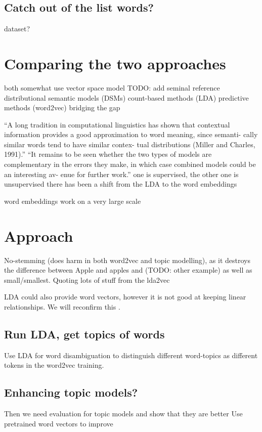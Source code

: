 \documentclass{sig-alternate-05-2015}
\begin{document}
\subsection{Catch out of the list words?}
dataset?
\section{Comparing the two approaches}
both somewhat use vector space model TODO: add seminal reference
distributional semantic models (DSMs)
count-based methods (LDA)
predictive methods (word2vec)
\cite{Baroni2014}
bridging the gap

``A long tradition in computational linguistics has shown that contextual information provides a good approximation to word meaning, since semanti- cally similar words tend to have similar contex- tual distributions (Miller and Charles, 1991).''
``It remains to be seen whether the two types of models are complementary in the errors they make, in which case combined models could be an interesting av- enue for further work.''
one is supervised, the other one is unsupervised
there has been a shift from the LDA to the word embeddings

word embeddings work on a very large scale

\section{Approach}
No-stemming (does harm in both word2vec and topic modelling), as it destroys the difference between Apple and apples and (TODO: other example) as well as small/smallest.
Quoting lots of stuff from the lda2vec

LDA could also provide word vectors, however it is not good at keeping linear relationships\cite{Mikolov2013b,Mikolov2013a}.
We will reconfirm this .
\subsection{Run LDA, get topics of words}
Use LDA for word disambiguation to distinguish different word-topics as different tokens in the word2vec training.

\subsection{Enhancing topic models?}
Then we need evaluation for topic models and show that they are better
Use pretrained word vectors to improve \cite{Das2015}




\end{document}
